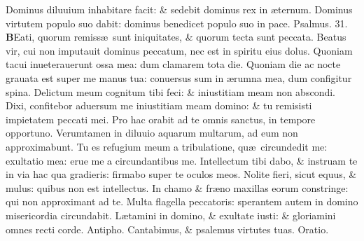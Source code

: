 \documentclass[a5paper,10pt]{book}
\def\ae{æ}
\begin{document}
\begin{multicols*}{2}
\newline \color{red} D\color{black}ominus diluuium inhabitare facit: \& sedebit dominus rex in \ae ternum.
\newline \color{red} D\color{black}ominus virtutem populo suo dabit: dominus benedicet populo suo in pace.
\newline \color{red} Psalmus. \hypertarget{ps31}{31.} \color{black}
\vspace{-1em}
\lettrine[lines=2]{\bfseries \color{red} B}{}Eati, quorum remiss\ae \ sunt iniquitates, \& quorum tecta sunt peccata.
\newline \color{red} B\color{black}eatus vir, cui non imputauit dominus peccatum, nec est in spiritu eius dolus.
\newline \color{red} Q\color{black}uoniam tacui inueterauerunt ossa mea: dum clamarem tota die.
\newline \color{red} Q\color{black}uoniam die ac nocte grauata est super me manus tua: conuersus sum in \ae rumna mea, dum configitur spina.
\newline \color{red} D\color{black}elictum meum cognitum tibi feci: \& iniustitiam meam non abscondi.
\newline \color{red} D\color{black}ixi, confitebor aduersum me iniustitiam meam domino: \& tu remisisti impietatem peccati mei.
\newline \color{red} P\color{black}ro hac orabit ad te omnis sanctus, in tempore opportuno.
\newline \color{red} V\color{black}erumtamen in diluuio aquarum multarum, ad eum non approximabunt.
\newline \color{red} T\color{black}u es refugium meum a tribulatione, qu\ae \ circundedit me: exultatio mea: erue me a circundantibus me.
\newline \color{red} I\color{black}ntellectum tibi dabo, \& instruam te in via hac qua gradieris: firmabo super te oculos meos.
\newline \color{red} N\color{black}olite fieri, sicut equus, \& mulus: quibus non est intellectus.
\newline \color{red} I\color{black}n chamo \& fr\ae no maxillas eorum constringe: qui non approximant ad te.
\newline \color{red} M\color{black}ulta flagella peccatoris: sperantem autem in domino misericordia circundabit.
\newline \color{red} L\color{black}\ae tamini in domino, \& exultate iusti: \& gloriamini omnes recti corde.
\newline \color{red} Antipho. \color{black} Cantabimus, \& psalemus virtutes tuas. \color{red} Oratio. \color{black}

\end{multicols*}
\end{document}
